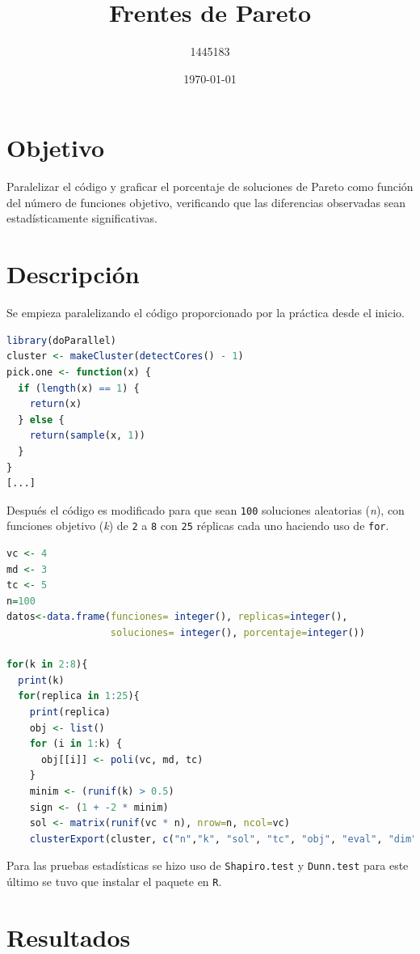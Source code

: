 \documentclass{article}
\author{1445183}
\title{Frentes de Pareto}
\date{\today}
\begin{document}
\maketitle

\section{Objetivo}
Paralelizar el código y graficar el porcentaje de soluciones de Pareto como función del número de funciones objetivo, verificando que las diferencias observadas sean estadísticamente significativas.

\section{Descripción}
Se empieza paralelizando el código proporcionado por la práctica \cite{elisaweb11} desde el inicio.
\begin{lstlisting}[language=R]
library(doParallel)
cluster <- makeCluster(detectCores() - 1)
pick.one <- function(x) {
  if (length(x) == 1) {
    return(x)
  } else {
    return(sample(x, 1))
  }
}
[...]
\end{lstlisting}

Después el código es modificado para que sean \texttt{100} soluciones aleatorias (\textit{n}), con funciones objetivo (\textit{k}) de \texttt{2} a \texttt{8} con \texttt{25} réplicas cada uno haciendo uso de \texttt{for}.

\begin{lstlisting}[language=R]
vc <- 4
md <- 3
tc <- 5
n=100
datos<-data.frame(funciones= integer(), replicas=integer(), 
                  soluciones= integer(), porcentaje=integer())

for(k in 2:8){
  print(k)
  for(replica in 1:25){
    print(replica)
    obj <- list()
    for (i in 1:k) {
      obj[[i]] <- poli(vc, md, tc)
    }
    minim <- (runif(k) > 0.5)
    sign <- (1 + -2 * minim)
    sol <- matrix(runif(vc * n), nrow=n, ncol=vc)
    clusterExport(cluster, c("n","k", "sol", "tc", "obj", "eval", "dim", "valor"))
\end{lstlisting}

Para las pruebas estadísticas se hizo uso de \texttt{Shapiro.test} y \texttt{Dunn.test} para este último se tuvo que instalar el paquete en \texttt{R}.

\section{Resultados}
\end{document}
